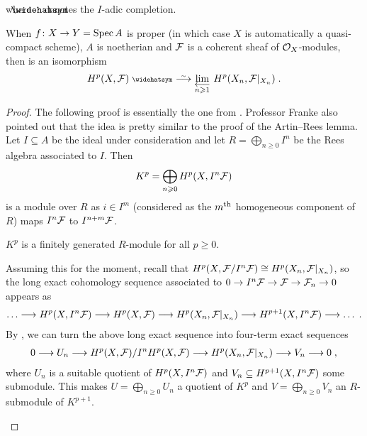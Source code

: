 \documentclass[a4paper,parskip=half,numbers=enddot, DIV=12]{scrreprt}
\renewcommand{\geq}{\geqslant}
\begin{document}
where $\roof{\phantom{x}}$ denotes the $I$-adic completion.
\begin{thm}
	When $f\colon X\morphism Y=\Spec A$ is proper (in which case $X$ is automatically a quasi-compact scheme), $A$ is noetherian and $\mathcal{F}$ is a coherent sheaf of $\mathcal{O}_X$-modules, then  is an isomorphism
	\begin{align*}
		H^p(X,\Ff)^\complete\isomorphism \limit[n\geq 1]H^p(X_n,\Ff|_{X_n})\;.
	\end{align*}
\end{thm}

\begin{proof}
	The following proof is essentially the one from \cite[Ch.\:III (4.1.7)]{egaIII}. Professor Franke also pointed out that the idea is pretty similar to the proof of the Artin--Rees lemma. Let $I\subseteq A$ be the ideal under consideration and let $R=\bigoplus_{n\geq 0}I^n$ be the Rees algebra associated to $I$. Then
	\begin{align*}
		K^p=\bigoplus_{n\geq 0}H^p(X,I^n\Ff)
	\end{align*}
	is a module over $R$ as $i\in I^m$ (considered as the $m^{\text{th}}$ homogeneous component of $R$) maps $I^n\mathcal{F}$ to $I^{n+m}\mathcal{F}$.
	\begin{claim}
		$K^p$ is a finitely generated $R$-module for all $p\geq 0$.
	\end{claim}
	Assuming this for the moment, recall that $H^p(X,\mathcal{F}/I^n\mathcal{F})\cong H^p(X_n,\mathcal{F}|_{X_n})$, so the long exact cohomology sequence associated to $0\morphism I^n\Ff\morphism \Ff\morphism \Ff_n\morphism 0$ appears as
	\begin{align*}%
		\ldots\morphism H^p(X,I^n\Ff)\morphism H^p(X,\Ff)\morphism H^p(X_n,\Ff|_{X_n})\morphism H^{p+1}(X,I^n\Ff)\morphism\ldots \;.
	\end{align*}
	By , we can turn the above long exact sequence into four-term exact sequences
	\begin{align}\lbl{eq:FFSeq2}
		0\morphism U_n\morphism H^p(X,\Ff)/I^nH^p(X,\Ff)\morphism H^p(X_n,\Ff|_{X_n})\morphism V_n\morphism 0\;,
	\end{align}
	where $U_n$ is a suitable quotient of $H^p(X,I^n\mathcal{F})$ and $V_n\subseteq H^{p+1}(X,I^n\mathcal{F})$ some submodule. This makes $U=\bigoplus_{n\geq 0}U_n$ a quotient of $K^p$ and $V=\bigoplus_{n\geq 0}V_n$ an $R$-submodule of $K^{p+1}$.
	\begin{claim}

\end{claim}
\end{proof}
\end{document}
